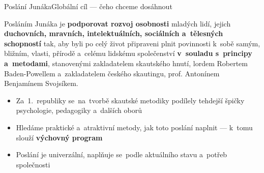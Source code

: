 \documentclass[compress, xelatex, 11pt, xcolor=dvipsnames, print, aspectratio=169,
	hyperref={
		bookmarks=true,
		unicode=true,
		colorlinks=true,
		pdftitle={Skautska vychovna metoda},
		plainpages=false,
		pdfauthor={Vojtech Zeisek},
		pdfsubject={Skautska vychovna metoda a jeji vyvoj za posledni stoleti a desetileti},
		pdfcreator={XeLaTeX},
		pdfkeywords={Junak, Pedagogika, Skaut, Skauting, Vychovna metoda},
		linkcolor=Red, %
		anchorcolor=ForestGreen, %
		citecolor=ForestGreen, %
		filecolor=ForestGreen, %
		menucolor=ForestGreen, %
		urlcolor=Sepia, %
		pdftex},
	url={hyphens, lowtilde} %
	]{beamer}
\begin{document}
\begin{frame}{Poslání Junáka}{Globální cíl --- čeho chceme dosáhnout}
	\begin{center}
		\begin{Large}
			Posláním Junáka je \textbf{podporovat rozvoj osobnosti} mladých lidí, jejich \textbf{duchovních, mravních, intelektuálních, sociálních a~tělesných schopností} tak, aby byli po celý život připraveni plnit povinnosti k~sobě samým, bližním, vlasti, přírodě a~celému lidskému společenství \textbf{v~souladu s~principy a~metodami}, stanovenými zakladatelem skautského hnutí, lordem Robertem Baden-Powellem a~zakladatelem českého skautingu, prof. Antonínem Benjamínem Svojsíkem.
		\end{Large}
	\end{center}
	\begin{itemize}
		\item Za~1.~republiky se~na~tvorbě skautské metodiky podílely tehdejší špičky psychologie, pedagogiky a~dalších oborů
		\item Hledáme praktické a~atraktivní metody, jak toto poslání naplnit --- k~tomu slouží \textbf{výchovný program}
		\item Poslání je univerzální, naplňuje se~podle aktuálního stavu a~potřeb společnosti
	\end{itemize}
\end{frame}
\end{document}
